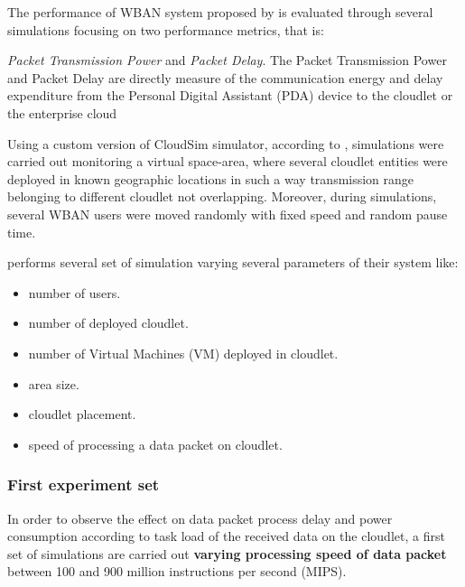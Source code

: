 \documentclass[sigchi]{acmart}
\begin{document}
The performance of WBAN system proposed by \citet{MSAReport} is evaluated through several simulations focusing on two performance metrics, that is:

\vspace{0.3cm}

\begin{quoting}[font=itshape, begintext={``}, endtext={''\cite[par.~4.2]{MSAReport}}]
\textit{Packet Transmission Power} and \textit{Packet Delay}. The Packet Transmission Power and Packet Delay are directly measure of the communication energy and delay expenditure from the Personal Digital Assistant (PDA) device to the cloudlet or the enterprise cloud

\end{quoting}

\vspace{0.3cm}

Using a custom version of CloudSim simulator, according to \citet{MSAReport}, simulations were carried out monitoring a virtual space-area, where several cloudlet entities were deployed in known geographic locations in such a way transmission range belonging to different cloudlet not overlapping. Moreover, during simulations, several WBAN users were moved randomly with fixed speed and random pause time. 

\citet{MSAReport} performs several set of simulation varying several parameters of their system like:
\begin{itemize}
\item number of users.
\item number of deployed cloudlet.
\item number of Virtual Machines (VM) deployed in cloudlet.
\item area size.
\item cloudlet placement.
\item speed of processing a data packet on cloudlet. 
\end{itemize}

\subsubsection{First experiment set}

In order to observe the effect on data packet process delay and power consumption according to task load of the received data on the cloudlet, a first set of simulations are carried out \textbf{varying processing speed of data packet} between 100 and 900 million instructions per second (MIPS). 
\end{document}
